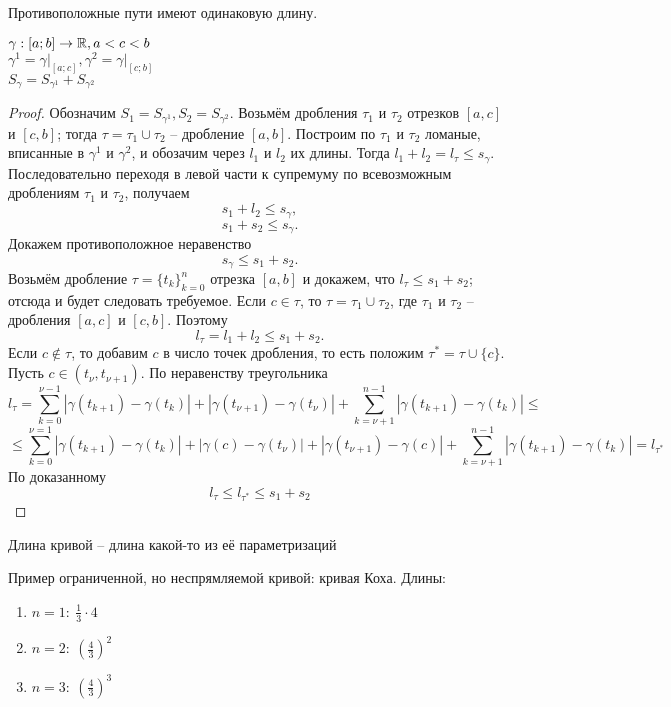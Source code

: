 \begin{Rem}
	Противоположные пути имеют одинаковую длину. 
\end{Rem}

\begin{Lm}
	$\gamma: [a;b] \to \mathbb{R}, a < c < b$\\
	$\gamma^1 = \gamma \big|_{[a;c]}, \gamma^2 = \gamma \big|_{[c;b]}$\\
	$S_{\gamma} = S_{\gamma^1} + S_{\gamma^2}$
\end{Lm}

\begin{proof}
	Обозначим $S_1 = S_{\gamma^1}, S_2 = S_{\gamma^2}$. Возьмём дробления $\tau_1$ и $\tau_2$ отрезков $[a, c]$ и $[c, b]$; тогда $\tau = \tau_1 \cup \tau_2$ -- дробление $[a, b]$. Построим по $\tau_1$ и $\tau_2$ ломаные, вписанные в $\gamma^1$ и $\gamma^2$, и обозачим через $l_1$ и $l_2$ их длины.
    Тогда $l_1 + l_2  = l_{\tau} \leqslant s_{\gamma}$. Последовательно переходя в левой части к супремуму по всевозможным дроблениям $\tau_1$ и $\tau_2$, получаем $$s_1 + l_2 \leqslant s_{\gamma},$$ $$ s_1 + s_2 \leqslant s_{\gamma}.$$
    Докажем противоположное неравенство $$s_{\gamma} \leqslant s_1 + s_2.$$
    Возьмём дробление $\tau = \{ t_k \}^n_{k = 0}$ отрезка $[a, b]$ и докажем, что $l_{\tau} \leqslant s_1 + s_2$; отсюда и будет следовать требуемое. Если $c \in \tau$, то $\tau = \tau_1 \cup \tau_2$, где $\tau_1$ и $\tau_2$ -- дробления $[a, c]$ и $[c, b]$. Поэтому $$l_{\tau} = l_1 + l_2 \leqslant s_1 + s_2.$$
    Если $c \notin \tau$, то добавим $c$ в число точек дробления, то есть положим $\tau^* = \tau \cup \{ c \}$. Пусть $c \in (t_{\nu}, t_{\nu + 1})$. По неравенству треугольника        
    $$ l_{\tau} = \sum_{k = 0}^{\nu - 1} |\gamma (t_{k + 1}) - \gamma (t_k) | + |\gamma (t_{\nu + 1}) - \gamma(t_{\nu}) | + \sum_{k = \nu + 1}^{n - 1}|\gamma (t_{k+1}) - \gamma (t_k) | \leqslant $$
    $$ \leqslant \sum_{k = 0}^{\nu = 1} |\gamma (t_{k+1}) -\gamma (t_k)| + |\gamma(c) - \gamma(t_{\nu})| + |\gamma(t_{\nu + 1}) - \gamma(c)| + \sum_{k = \nu + 1}^{n - 1}|\gamma (t_{k + 1}) - \gamma(t_k)| = l_{\tau^*}$$
    По доказанному $$l_{\tau} \leqslant l_{\tau^*} \leqslant s_1 + s_2$$
\end{proof}

\begin{Def} 
	Длина кривой -- длина какой-то из её параметризаций
\end{Def} 

\begin{Example}
	Пример ограниченной, но неспрямляемой кривой: кривая Коха.
	Длины:
	\begin{enumerate}
		\item $\displaystyle n = 1: \ \frac{1}{3} \cdot 4$\\
		\item $\displaystyle n = 2: \ \left(\frac{4}{3}\right)^2$
		\item $\displaystyle n = 3: \ \left(\frac{4}{3}\right)^3$
	\end{enumerate}
\end{Example}

